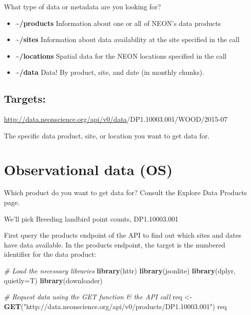 \documentclass[]{book}
\newenvironment{Shaded}{\begin{snugshade}}{\end{snugshade}}
\newcommand{\CommentTok}[1]{\textcolor[rgb]{0.56,0.35,0.01}{\textit{#1}}}
\newcommand{\DataTypeTok}[1]{\textcolor[rgb]{0.13,0.29,0.53}{#1}}
\newcommand{\KeywordTok}[1]{\textcolor[rgb]{0.13,0.29,0.53}{\textbf{#1}}}
\newcommand{\NormalTok}[1]{#1}
\newcommand{\StringTok}[1]{\textcolor[rgb]{0.31,0.60,0.02}{#1}}
\begin{document}
What type of data or metadata are you looking for?

\begin{itemize}
\item
  \textbf{\textasciitilde{}/products}
  Information about one or all of NEON's data products
\item
  \textbf{\textasciitilde{}/sites}
  Information about data availability at the site specified in the call
\item
  \textbf{\textasciitilde{}/locations}
  Spatial data for the NEON locations specified in the call
\item
  \textbf{\textasciitilde{}/data}
  Data! By product, site, and date (in monthly chunks).
\end{itemize}

\hypertarget{targets}{%
\subsection{Targets:}\label{targets}}

{\url{http://data.neonscience.org/api/v0/data}}{/DP1.10003.001/WOOD/2015-07}

The specific data product, site, or location you want to get data for.

\hypertarget{observational-data-os}{%
\section{Observational data (OS)}\label{observational-data-os}}

Which product do you want to get data for? Consult the Explore Data Products page.

We'll pick Breeding landbird point counts, DP1.10003.001

First query the products endpoint of the API to find out which sites and dates
have data available. In the products endpoint, the target is the numbered
identifier for the data product:

\begin{Shaded}
\begin{Highlighting}[]
\CommentTok{# Load the necessary libraries}
\KeywordTok{library}\NormalTok{(httr)}
\KeywordTok{library}\NormalTok{(jsonlite)}
\KeywordTok{library}\NormalTok{(dplyr, }\DataTypeTok{quietly=}\NormalTok{T)}
\KeywordTok{library}\NormalTok{(downloader)}

\CommentTok{# Request data using the GET function & the API call}
\NormalTok{req <-}\StringTok{ }\KeywordTok{GET}\NormalTok{(}\StringTok{"http://data.neonscience.org/api/v0/products/DP1.10003.001"}\NormalTok{)}
\NormalTok{req}
\end{Highlighting}
\end{Shaded}
\end{document}
